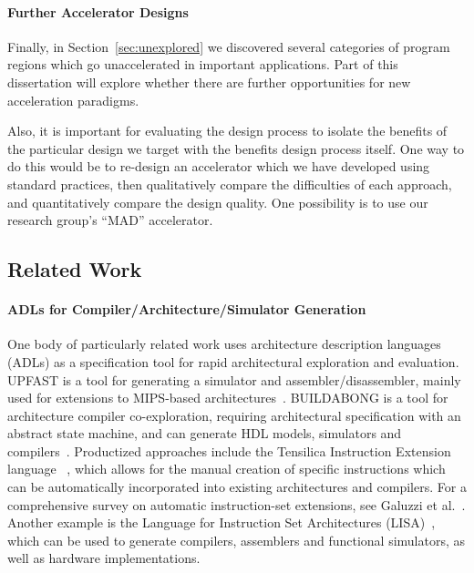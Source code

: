 \paragraph{Further Accelerator Designs} Finally, in
Section~\ref{sec:unexplored} we discovered several categories of program
regions which go unaccelerated in important applications.  Part of this
dissertation will explore whether there are further opportunities for new
acceleration paradigms. 

Also, it is important for evaluating the design process to
isolate the benefits of the particular design we target with 
the benefits design process itself.  One way to do this would be to 
re-design an accelerator which we have developed using standard
practices, then qualitatively compare the difficulties of each approach,
and quantitatively compare the design quality.  One possibility is
to use our research group's ``MAD'' accelerator.


\subsection{Related Work} 

\paragraph{ADLs for Compiler/Architecture/Simulator Generation} One body of
particularly related work uses architecture description languages (ADLs) as a
specification tool for rapid architectural exploration and evaluation.
UPFAST is a tool for generating a simulator and assembler/disassembler,
mainly used for extensions to MIPS-based architectures~\cite{upfast}.
BUILDABONG is a tool for architecture compiler co-exploration, requiring
architectural specification with an abstract state machine, and can generate
HDL models, simulators and compilers~\cite{build_a_bong}.  Productized
approaches include the Tensilica Instruction Extension language
~\cite{Gonzalez:2000:XCE:623292.624348}, which allows for the manual creation
of specific instructions which can be automatically incorporated into
existing architectures and compilers. For a comprehensive survey on
automatic instruction-set extensions, see Galuzzi et
al.~\cite{Galuzzi:2011:IEP:1968502.1968509}. Another example is the Language
for Instruction Set Architectures (LISA)~\cite{Hoffmann:2002:AEE:640673},
which can be used to generate compilers, assemblers and functional
simulators, as well as hardware implementations.  

